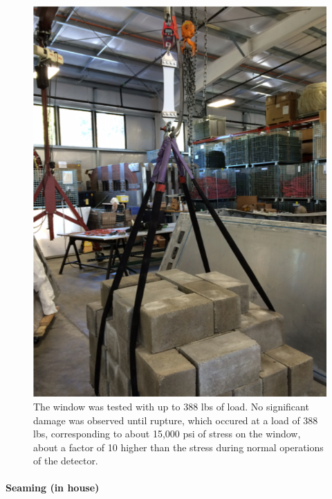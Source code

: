 \begin{figure}
	\centering
	\includegraphics[width=1.0\columnwidth,keepaspectratio]{img/windowTest.png}
	\caption{The window was tested with up to 388 lbs of load. No significant damage was observed until rupture, which occured at a load of 388 lbs,
			   corresponding to about 15,000 psi of stress on the window, about a factor of 10 higher than the stress during normal operations of the detector.}
	\label{fig:windowTest}
\end{figure}


\paragraph{Seaming (in house)}


